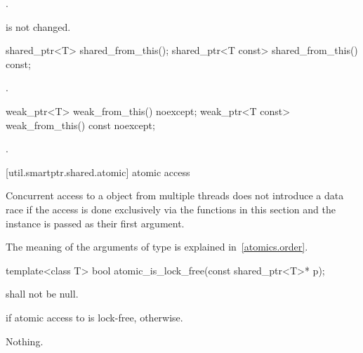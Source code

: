 \begin{itemdescr}
\pnum\returns  {}.

\pnum\begin{note}  is not changed. \end{note}
\end{itemdescr}

%
%
\begin{itemdecl}
shared_ptr<T>       shared_from_this();
shared_ptr<T const> shared_from_this() const;
\end{itemdecl}

\begin{itemdescr}
\pnum\returns  {}.
\end{itemdescr}

%
%
\begin{itemdecl}
weak_ptr<T>       weak_from_this() noexcept;
weak_ptr<T const> weak_from_this() const noexcept;
\end{itemdecl}

\begin{itemdescr}
\pnum\returns  {}.
\end{itemdescr}

[util.smartptr.shared.atomic]{ atomic access}

\pnum
Concurrent access to a  object from multiple threads does not
introduce a data race if the access is done exclusively via the functions in
this section and the instance is passed as their first argument.

\pnum
The meaning of the arguments of type  is explained in~\ref{atomics.order}.

%
\begin{itemdecl}
template<class T>
  bool atomic_is_lock_free(const shared_ptr<T>* p);
\end{itemdecl}

\begin{itemdescr}
\pnum
\requires {} shall not be null.

\pnum
\returns {} if atomic access to  is lock-free,  otherwise.

\pnum
\throws Nothing.
\end{itemdescr}

